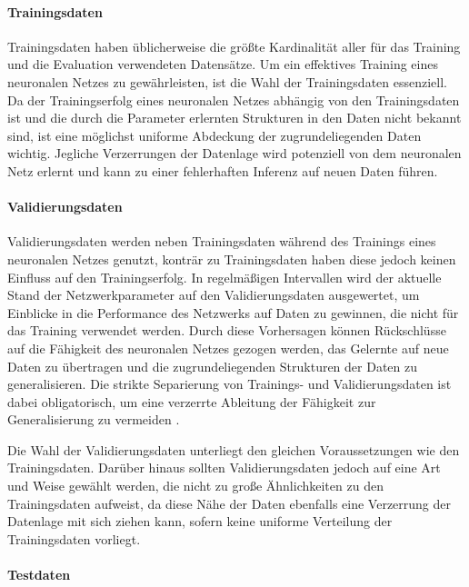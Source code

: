 \paragraph{Trainingsdaten}

Trainingsdaten haben üblicherweise die größte Kardinalität aller für das Training und die Evaluation verwendeten Datensätze. Um ein effektives Training eines neuronalen Netzes zu gewährleisten, ist die Wahl der Trainingsdaten essenziell. Da der Trainingserfolg eines neuronalen Netzes abhängig von den Trainingsdaten ist und die durch die Parameter erlernten Strukturen in den Daten nicht bekannt sind, ist eine möglichst uniforme Abdeckung der zugrundeliegenden Daten wichtig. Jegliche Verzerrungen der Datenlage wird potenziell von dem neuronalen Netz erlernt und kann zu einer fehlerhaften Inferenz auf neuen Daten führen.

\paragraph{Validierungsdaten}

Validierungsdaten werden neben Trainingsdaten während des Trainings eines neuronalen Netzes genutzt, konträr zu Trainingsdaten haben diese jedoch keinen Einfluss auf den Trainingserfolg. In regelmäßigen Intervallen wird der aktuelle Stand der Netzwerkparameter auf den Validierungsdaten ausgewertet, um Einblicke in die Performance des Netzwerks auf Daten zu gewinnen, die nicht für das Training verwendet werden. Durch diese Vorhersagen können Rückschlüsse auf die Fähigkeit des neuronalen Netzes gezogen werden, das Gelernte auf neue Daten zu übertragen und die zugrundeliegenden Strukturen der Daten zu generalisieren. Die strikte Separierung von Trainings- und Validierungsdaten ist dabei obligatorisch, um eine verzerrte Ableitung der Fähigkeit zur Generalisierung zu vermeiden \cite{nn_terminology}.

Die Wahl der Validierungsdaten unterliegt den gleichen Voraussetzungen wie den Trainingsdaten. Darüber hinaus sollten Validierungsdaten jedoch auf eine Art und Weise gewählt werden, die nicht zu große Ähnlichkeiten zu den Trainingsdaten aufweist, da diese Nähe der Daten ebenfalls eine Verzerrung der Datenlage mit sich ziehen kann, sofern keine uniforme Verteilung der Trainingsdaten vorliegt.

\paragraph{Testdaten}


